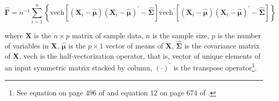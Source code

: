 \begin{equation}
    \label{eq:gammacap-gen}
    \hat{\boldsymbol{\Gamma}}
    =
    n^{- 1}
    \sum_{i = 1}^{n}
    \left\{
      \mathrm{vech}
      \left[
      \left(
      \mathbf{X}_i - \hat{\boldsymbol{\mu}}
      \right)
      \left(
      \mathbf{X}_i - \hat{\boldsymbol{\mu}}
      \right)^{\prime}
      -
      \hat{\boldsymbol{\Sigma}}
      \right]
      \mathrm{vech}^{\prime}
      \left[
      \left(
      \mathbf{X}_i - \hat{\boldsymbol{\mu}}
      \right)
      \left(
      \mathbf{X}_i - \hat{\boldsymbol{\mu}}
      \right)^{\prime}
      -
      \hat{\boldsymbol{\Sigma}}
      \right]
      \right\}
\end{equation}

\noindent where
$\mathbf{X}$ is the $n \times p$ matrix of sample data,
$n$ is the sample size,
$p$ is the number of variables in $\mathbf{X}$,
$\hat{\boldsymbol{\mu}}$ is the $p \times 1$ vector of means of $\mathbf{X}$,
$\hat{\boldsymbol{\Sigma}}$ is the covariance matrix of $\mathbf{X}$,
$\mathrm{vech}$ is the half-vectorization operator,
that is, vector of unique elements of an input symmetric matrix
stacked by column,
$\left( \cdot \right)^{\prime}$
is the transpose operator\footnote{
  See equation on page 496 of \Textcite{Yuan-2006}
  and equation 12 on page 674 of \Textcite{Yuan-2011}.
}.
